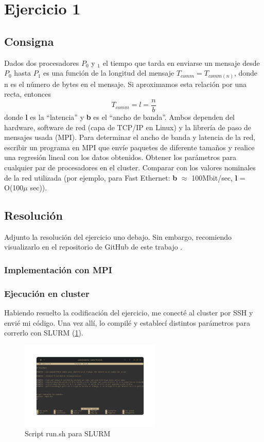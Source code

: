 \graphicspath{{Images/}}

\section{Ejercicio 1}\label{cap:ej1}
\subsection{Consigna}
    Dados dos procesadores $P_0$ y $_1$ el tiempo que tarda en enviarse un mensaje desde $P_0$ hasta $P_1$ es una función de la longitud del mensaje $T_{comm} = T_{comm(n)}$, donde n es el número de bytes en el mensaje. Si aproximamos esta relación por una recta, entonces
    $$T_{comm} = l = \frac{n}{b}$$
    donde \textbf{l} es la “latencia” y \textbf{b} es el “ancho de banda”. Ambos dependen del hardware, software de red (capa de TCP/IP en Linux) y la librería de paso de mensajes usada (MPI). Para determinar el ancho de banda y latencia de la red, escribir un programa en MPI que envíe paquetes de diferente tamaños y realice una regresión lineal con los datos obtenidos. Obtener los parámetros para cualquier par de procesadores en el cluster. Comparar con los valores nominales de la red utilizada (por ejemplo, para Fast Ethernet: \textbf{b} $\approx$ 100Mbit/sec, \textbf{l} = O(100$\mu$ sec)).

\subsection{Resolución}
Adjunto la resolución del ejercicio uno debajo. Sin embargo, recomiendo visualizarlo en el repositorio de GitHub de este trabajo \cite{justog220_practica-car_2023}.

\subsubsection{Implementación con MPI}


\subsubsection{Ejecución en cluster}
Habiendo resuelto la codificación del ejercicio, me conecté al cluster por SSH y envié mi código. Una vez allí, lo compilé y establecí distintos parámetros para correrlo con SLURM (\ref{fig:scriptSLURM}).

\begin{figure}[H]
    \centering
    \includegraphics[width=0.60\textwidth]{Images/ej1/Captura desde 2023-08-30 14-22-23.png}
    \caption{Script run.sh para SLURM}
    \label{fig:scriptSLURM}
\end{figure}

